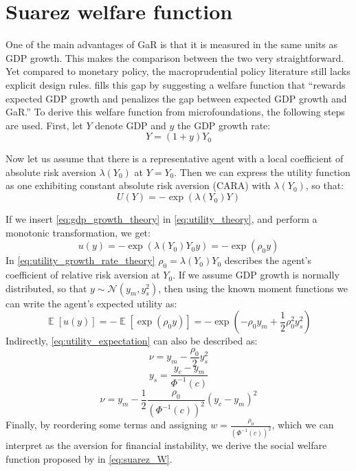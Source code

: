 \section{Suarez welfare function}
\label{appx:suarez}
One of the main advantages of GaR is that it is measured in the same units as GDP growth. This makes the comparison between the two very straightforward. Yet compared to monetary policy, the macroprudential policy literature still lacks explicit design rules. \citet{suarez2022} fills this gap by suggesting a welfare function that “rewards expected GDP growth and penalizes the gap between expected GDP growth and GaR.” To derive this welfare function from microfoundations, the following steps are used.
First, let $Y$ denote GDP and $y$ the GDP growth rate:
\begin{equation}
    \label{eq:gdp_growth_theory}
    Y = (1+y)Y_0
\end{equation}

Now let us assume that there is a representative agent with a local coefficient of absolute risk aversion $\lambda(Y_0)$ at $Y=Y_0$. Then we can express the utility function as one exhibiting constant absolute risk aversion (CARA) with $\lambda(Y_0)$, so that:
\begin{equation}
    \label{eq:utility_theory}
    U(Y) = -\exp{\left(\lambda(Y_0)Y\right)}
\end{equation}

If we insert \autoref{eq:gdp_growth_theory} in \autoref{eq:utility_theory}, and perform a monotonic transformation, we get:
\begin{equation}
    \label{eq:utility_growth_rate_theory}
    u(y) = -\exp{\left(\lambda(Y_0)Y_0y\right)} = -\exp{\left(\rho_0 y\right)}
\end{equation}
In \autoref{eq:utility_growth_rate_theory} $\rho_0=\lambda(Y_0)Y_0$ describes the agent’s coefficient of relative risk aversion at $Y_0$. If we assume GDP growth is normally distributed, so that $y\sim\mathcal{N}(y_m,y_s^2)$, then using the known moment functions we can write the agent’s expected utility as:
\begin{equation}
    \label{eq:utility_expectation}
    \mathop{\mathbb{E}}\left[u(y)\right] =  -\mathop{\mathbb{E}}\left[\exp{\left(\rho_0 y\right)}\right] = -\exp{\left(-\rho_0 y_m + \frac{1}{2}\rho_0^2 y_s^2 \right)}
\end{equation}
Indirectly, \autoref{eq:utility_expectation} can also be described as: 
\begin{equation}
    \nu = y_m - \frac{\rho_0}{2}y_s^2 
\end{equation}
\begin{equation}
    y_s = \frac{y_c-y_m}{\Phi^{-1}(c)}
\end{equation}
\begin{equation}
    \nu = y_m - \frac{1}{2}\frac{\rho_0}{\left(\Phi^{-1}(c)\right)^2} (y_c - y_m)^2 
\end{equation}
Finally, by reordering some terms and assigning $w=\frac{\rho_0}{\left(\Phi^{-1}(c)\right)^2}$, which we can interpret as the aversion for financial instability, we derive the social welfare function proposed by \citet{suarez2022} in \autoref{eq:suarez_W}.

